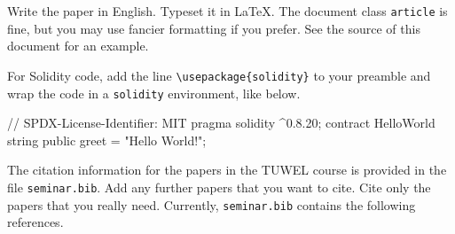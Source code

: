 \documentclass{article}
\begin{document}
Write the paper in English. Typeset it in \LaTeX. The document class
\verb"article" is fine, but you may use fancier formatting if you prefer. See
the source of this document for an example.

For Solidity code, add the line  \verb"\usepackage{solidity}" to your preamble
and wrap the code in a \verb"solidity" environment, like below.
\begin{solidity}
// SPDX-License-Identifier: MIT
pragma solidity ^0.8.20;
contract HelloWorld {
    string public greet = "Hello World!";
}
\end{solidity}

The citation information for the papers in the TUWEL course is provided
in the file \verb"seminar.bib". Add any further papers that you want to cite.
Cite only the papers that you really need.
Currently, \verb"seminar.bib" contains the following references.
\nocite{*}


\end{document}
